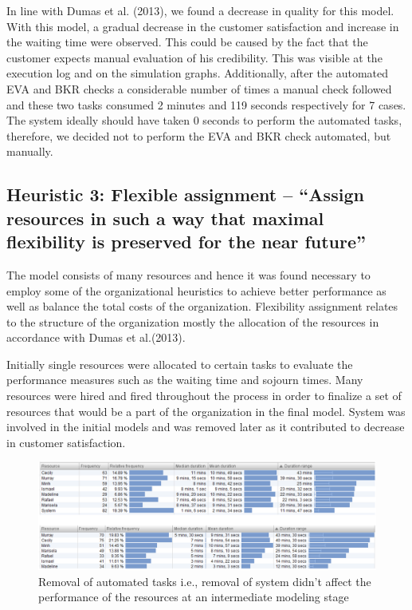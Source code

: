 \documentclass[a4paper]{article} %
\begin{document}
In line with Dumas et al. (2013)\cite{dumas2013}, we found a decrease in quality for this model. With this model, a gradual decrease in the customer satisfaction and increase in the waiting time were observed. This could be caused by the fact that the customer expects manual evaluation of his credibility. This was visible at the execution log and on the simulation graphs. Additionally, after the automated EVA and BKR checks a considerable number of times a manual check followed and these two tasks consumed 2 minutes and 119 seconds respectively for 7 cases. The system ideally should have taken 0 seconds to perform the automated tasks, therefore, we decided not to perform the EVA and BKR check automated, but manually.

\subsection{Heuristic 3: Flexible assignment – “Assign resources in such a way that maximal flexibility is preserved for the near future” }

The model consists of many resources and hence it was found necessary to employ some of the organizational heuristics to achieve better performance as well as balance the total costs of the organization. Flexibility assignment relates to the structure of the organization mostly the allocation of the resources in accordance with Dumas et al.(2013)\cite{dumas2013}.

Initially single resources were allocated to certain tasks to evaluate the performance measures such as the waiting time and sojourn times. Many resources were hired and fired throughout the process in order to finalize a set of resources that would be a part of the organization in the final model. System was involved in the initial models and was removed later as it contributed to decrease in customer satisfaction.\\

\begin{figure}[H]
\centering
\includegraphics[scale=0.6]{h4}
\caption{Removal of automated tasks i.e., removal of system didn’t affect the performance of the resources at an intermediate modeling stage}
\label{H4}
\end{figure}
\end{document}
